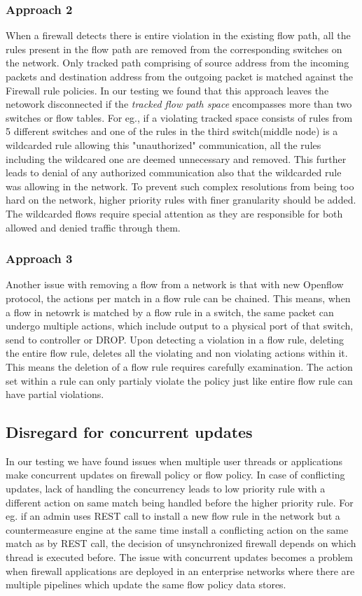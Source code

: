 	\subsubsection{Approach 2}
 	 When a firewall detects there is entire violation in the existing flow path, all the rules present in the flow path are removed from the corresponding switches on the network. Only tracked path comprising of source address from the incoming packets and destination address from the outgoing packet is matched against the Firewall rule policies. In our testing we found that this approach leaves the netowork disconnected if the  \textit{tracked flow path space} encompasses more than two switches or flow tables. For eg., if a violating tracked space consists of rules from 5 different switches and one of the rules in the third switch(middle node) is a wildcarded rule allowing this "unauthorized" communication, all the rules including the wildcared one are deemed unnecessary and removed. This further leads to denial of any authorized communication also that the wildcarded rule was allowing in the network.
 	 To prevent such complex resolutions from being too hard on the network, higher priority rules with finer granularity should be added. The wildcarded flows require special attention as they are responsible for both allowed and denied traffic through them.
	\subsubsection{Approach 3}
	 Another issue with removing a flow from a network is that with new Openflow protocol, the actions per match in a flow rule can be chained. This means, when a flow in netowrk is matched by a flow rule in a switch, the same packet can undergo multiple actions, which include output to a physical port of that switch, send to controller or DROP. Upon detecting a violation in a flow rule, deleting the entire flow rule, deletes all the violating and non violating actions within it. This means the deletion of a flow rule requires carefully examination. The action set within a rule can only partialy violate the policy just like entire flow rule can have partial violations.

 \subsection{Disregard for concurrent updates}
 In our testing we have found issues when multiple user threads or applications make concurrent updates on firewall policy or flow policy. In case of conflicting updates, lack of handling the concurrency leads to low priority rule with a different action on same match being handled before the higher priority rule. For eg. if an admin uses REST call to install a new flow rule in the network but a countermeasure engine at the same time install a conflicting action on the same match as by REST call, the decision of unsynchronized firewall depends on which thread is executed before. The issue with concurrent updates becomes a problem when firewall applications are deployed in an enterprise networks where there are multiple pipelines which update the same flow policy data stores.
 

